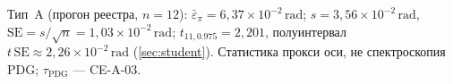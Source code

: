 Тип~A (прогон реестра, $n=12$):
$\bar{\varepsilon}_{\pi}=6{,}37\times 10^{-2}\,\mathrm{rad}$;
$s=3{,}56\times 10^{-2}\,\mathrm{rad}$,
$\mathrm{SE}=s/\sqrt{n}=1{,}03\times 10^{-2}\,\mathrm{rad}$;
$t_{11,0.975}=2{,}201$, полуинтервал $t\,\mathrm{SE}\approx 2{,}26\times 10^{-2}\,\mathrm{rad}$
(\cref{sec:student}).
Статистика прокси оси, не спектроскопия PDG; $\tau_{\mathrm{PDG}}$ --- CE-A-03.
